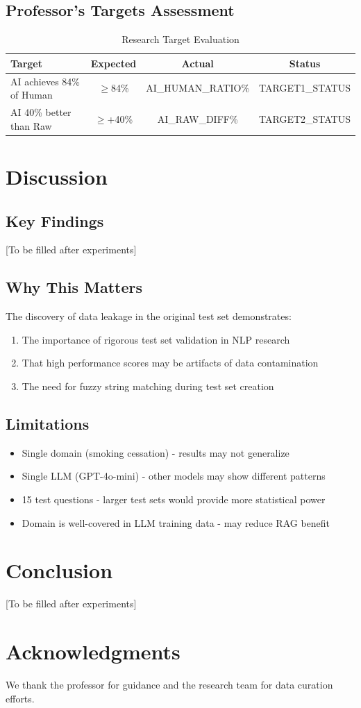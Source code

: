\documentclass{article}
\begin{document}
\subsection{Professor's Targets Assessment}

\begin{table}[h]
\centering
\caption{Research Target Evaluation}
\begin{tabular}{lccc}
\toprule
Target & Expected & Actual & Status \\
\midrule
AI achieves 84\% of Human & $\geq$84\% & {{AI_HUMAN_RATIO}}\% & {{TARGET1_STATUS}} \\
AI 40\% better than Raw & $\geq$+40\% & {{AI_RAW_DIFF}}\% & {{TARGET2_STATUS}} \\
\bottomrule
\end{tabular}
\label{tab:targets}
\end{table}

\section{Discussion}

\subsection{Key Findings}
[To be filled after experiments]

\subsection{Why This Matters}
The discovery of data leakage in the original test set demonstrates:
\begin{enumerate}
    \item The importance of rigorous test set validation in NLP research
    \item That high performance scores may be artifacts of data contamination
    \item The need for fuzzy string matching during test set creation
\end{enumerate}

\subsection{Limitations}
\begin{itemize}
    \item Single domain (smoking cessation) - results may not generalize
    \item Single LLM (GPT-4o-mini) - other models may show different patterns
    \item 15 test questions - larger test sets would provide more statistical power
    \item Domain is well-covered in LLM training data - may reduce RAG benefit
\end{itemize}

\section{Conclusion}
[To be filled after experiments]

\section*{Acknowledgments}
We thank the professor for guidance and the research team for data curation efforts.
\end{document}
